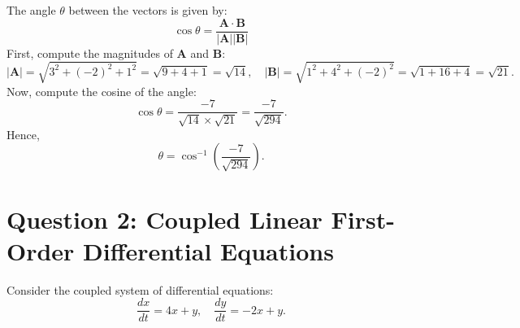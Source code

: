 \documentclass{article}
\begin{document}
\begin{enumerate}[a)]
  The angle \( \theta \) between the vectors is given by:
  \[
  \cos \theta = \frac{\mathbf{A} \cdot \mathbf{B}}{|\mathbf{A}| |\mathbf{B}|}
  \]
  First, compute the magnitudes of \( \mathbf{A} \) and \( \mathbf{B} \):
  \[
  |\mathbf{A}| = \sqrt{3^2 + (-2)^2 + 1^2} = \sqrt{9 + 4 + 1} = \sqrt{14}, \quad |\mathbf{B}| = \sqrt{1^2 + 4^2 + (-2)^2} = \sqrt{1 + 16 + 4} = \sqrt{21}.
  \]
  Now, compute the cosine of the angle:
  \[
  \cos \theta = \frac{-7}{\sqrt{14} \times \sqrt{21}} = \frac{-7}{\sqrt{294}}.
  \]
  Hence,
  \[
  \theta = \cos^{-1} \left( \frac{-7}{\sqrt{294}} \right).
  \]

\end{enumerate}

\section*{Question 2: Coupled Linear First-Order Differential Equations}

Consider the coupled system of differential equations:
\[
\frac{dx}{dt} = 4x + y, \quad \frac{dy}{dt} = -2x + y.
\]
\end{document}
